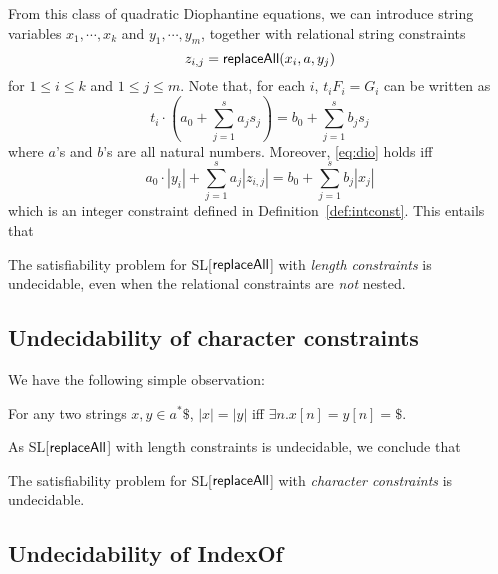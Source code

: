 From this class of quadratic Diophantine equations, we can introduce string variables $x_1, \cdots, x_k$ and $y_1, \cdots, y_m$, together with relational string constraints 
\[z_{i,j}=\mathsf{replaceAll}(x_i, a, y_j)\]
for $1\leq i\leq k$ and $1\leq j\leq m$. Note that, for each $i$,  $t_i F_i=G_i$ can be written as
\begin{equation} \label{eq:dio}
t_i\cdot \left(a_0+\sum_{j=1}^s a_j s_j\right) =  b_0+\sum_{j=1}^s b_j s_j
\end{equation}
where $a$'s and $b$'s are all natural numbers. Moreover, \eqref{eq:dio} holds iff 
\[a_0\cdot |y_i|+ \sum_{j=1}^s a_j |z_{i,j}| =  b_0+ \sum_{j=1}^s b_j |x_j| \] 
which is an integer constraint defined in Definition~\ref{def:intconst}. This entails that
\begin{proposition}
	The satisfiability problem for SL[$\mathsf{replaceAll}$] with \emph{length constraints} is undecidable, even when the relational constraints are \emph{not} nested.
\end{proposition}

%	
%	

\subsection{Undecidability of character constraints}


We have the following simple observation:

\begin{lemma}
	For any two strings $x,y\in a^*\$$, $|x|=|y|$ iff $\exists n. x[n]=y[n]=\$$. 
\end{lemma}

As SL[$\mathsf{replaceAll}$] with length constraints is undecidable, we conclude that 

\begin{theorem}
	The satisfiability problem for SL[$\mathsf{replaceAll}$] with \emph{character constraints} is undecidable. 
\end{theorem}



\subsection{Undecidability of IndexOf}
 

